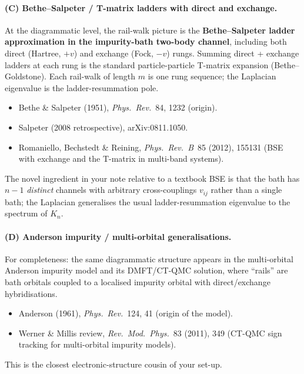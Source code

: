 \documentclass[11pt,a4paper]{article}
\begin{document}
\paragraph{(C) Bethe--Salpeter / T-matrix ladders with direct and exchange.}
At the diagrammatic level, the rail-walk picture is the
\textbf{Bethe--Salpeter ladder approximation in the impurity-bath two-body
channel}, including both direct (Hartree, $+v$) and exchange (Fock, $-v$)
rungs. Summing direct + exchange ladders at each rung is the standard
particle-particle T-matrix expansion (Bethe--Goldstone). Each rail-walk
of length $m$ is one rung sequence; the Laplacian eigenvalue is the
ladder-resummation pole.
\begin{itemize}[leftmargin=2em,itemsep=1pt]
  \item Bethe \& Salpeter (1951), \emph{Phys.\ Rev.}~84, 1232 (origin).
  \item Salpeter (2008 retrospective), arXiv:0811.1050.
  \item Romaniello, Bechstedt \& Reining,
        \emph{Phys.\ Rev.\ B}~85 (2012), 155131 (BSE with exchange and the
        T-matrix in multi-band systems).
\end{itemize}
The novel ingredient in your note relative to a textbook BSE is that the
bath has $n{-}1$ \emph{distinct} channels with arbitrary cross-couplings
$v_{ij}$ rather than a single bath; the Laplacian generalises the usual
ladder-resummation eigenvalue to the spectrum of $K_n$.

\paragraph{(D) Anderson impurity / multi-orbital generalisations.}
For completeness: the same diagrammatic structure appears in the
multi-orbital Anderson impurity model and its DMFT/CT-QMC solution, where
``rails'' are bath orbitals coupled to a localised impurity orbital with
direct/exchange hybridisations.
\begin{itemize}[leftmargin=2em,itemsep=1pt]
  \item Anderson (1961), \emph{Phys.\ Rev.}~124, 41 (origin of the model).
  \item Werner \& Millis review, \emph{Rev.\ Mod.\ Phys.}~83 (2011), 349
        (CT-QMC sign tracking for multi-orbital impurity models).
\end{itemize}
This is the closest electronic-structure cousin of your set-up.
\end{document}
